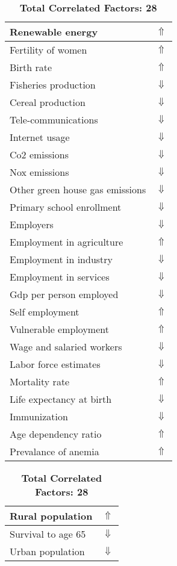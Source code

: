 \documentclass[12pt,notitlepage,oneside]{report}
\begin{document}
\begin{table}[!htb]
\caption{\textbf{Specific Disease Is: Typhoid fever $\Uparrow$}}
\centering
\label{Correlated Socio-economic Factors0}
\begin{tabular}{|l|l|}
\hline
Renewable energy & $\Uparrow$\\ \hline
Fertility of women & $\Uparrow$\\ \hline
Birth rate & $\Uparrow$\\ \hline
Fisheries production & $\Downarrow$\\ \hline
Cereal production & $\Downarrow$\\ \hline
Tele-communications & $\Downarrow$\\ \hline
Internet usage & $\Downarrow$\\ \hline
Co2 emissions & $\Downarrow$\\ \hline
Nox emissions & $\Downarrow$\\ \hline
Other green house gas emissions & $\Downarrow$\\ \hline
Primary school enrollment & $\Downarrow$\\ \hline
Employers & $\Downarrow$\\ \hline
Employment in agriculture & $\Uparrow$\\ \hline
Employment in industry & $\Downarrow$\\ \hline
Employment in services & $\Downarrow$\\ \hline
Gdp per person employed & $\Downarrow$\\ \hline
Self employment & $\Uparrow$\\ \hline
Vulnerable employment & $\Uparrow$\\ \hline
Wage and salaried workers & $\Downarrow$\\ \hline
Labor force estimates & $\Downarrow$\\ \hline
Mortality rate & $\Uparrow$\\ \hline
Life expectancy at birth & $\Downarrow$\\ \hline
Immunization & $\Downarrow$\\ \hline
Age dependency ratio & $\Uparrow$\\ \hline
Prevalance of anemia & $\Uparrow$\\ \hline
\end{tabular}
\begin{tabular}{|l|l|}
\hline
Rural population & $\Uparrow$\\ \hline
Survival to age 65 & $\Downarrow$\\ \hline
Urban population & $\Downarrow$\\ \hline
\end{tabular}
\caption*{\textbf{Total Correlated Factors: 28}}
\end{table}
\end{document}
